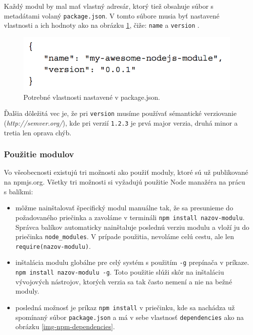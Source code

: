 Každý modul by mal mať vlastný adresár, ktorý tiež obsahuje súbor s metadátami volaný \verb|package.json|. V tomto súbore musia byť nastavené vlastnosti a ich hodnoty ako na obrázku \ref{img-npm-packagejson}, čiže: \verb|name| a \verb|version| \cite{nodejs-by-example}.

\begin{figure}[H]
  \centering
  \includegraphics[scale=0.7]{img/npm/npm-minimum.png}
  \caption{Potrebné vlastnosti nastavené v package.json.}
  \label{img-npm-packagejson}
\end{figure}

Ďalšia dôležitá vec je, že pri \verb|version| musíme používať sémantické verziovanie\\ (\textit{http://semver.org/}), kde pri verzií \verb|1.2.3| je prvá major verzia, druhá minor a tretia len oprava chýb.

\subsubsection{Použitie modulov}
Vo všeobecnosti existujú tri možnosti ako použiť moduly, ktoré sú už publikované na npmjs.org. Všetky tri možnosti si vyžadujú použitie Node manažéra na prácu s balíkmi: \cite{nodejs-by-example}

\begin{itemize}
\item môžme nainštalovať špecifický modul manuálne tak, že sa presunieme do požadovaného priečinka a zavoláme v termináli \verb|npm install nazov-modulu|. Správca balíkov automaticky nainštaluje poslednú verziu modulu a vloží ju do priečinka \verb|node_modules|. V prípade použitia, nevoláme celú cestu, ale len \verb|require(nazov-modulu)|.
\item inštalácia modulu globálne pre celý systém s použitím \verb|-g| prepínača v príkaze. \verb|npm install nazov-modulu -g|. Toto použitie slúži skôr na inštaláciu vývojových nástrojov, ktorých verzia sa tak často nemení a nie na bežné moduly.
\item posledná možnosť je príkaz \verb|npm install| v priečinku, kde sa nachádza už spomínaný súbor \verb|package.json| a má v sebe vlastnosť \verb|dependencies| ako na obrázku \ref{img-npm-dependencies}.
\end{itemize}

